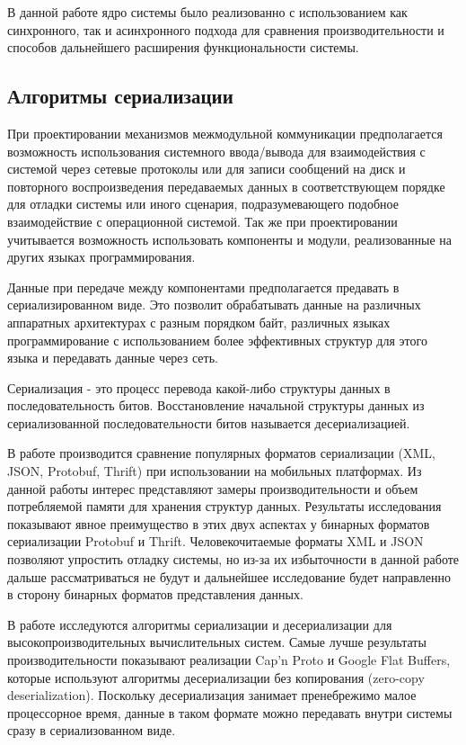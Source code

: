 В данной работе ядро системы было реализованно с использованием как синхронного, так и асинхронного подхода для сравнения производительности и способов дальнейшего расширения функциональности системы.

\subsection{Алгоритмы сериализации}

При проектировании механизмов межмодульной коммуникации предполагается возможность использования системного ввода/вывода для взаимодействия с системой через сетевые протоколы или для записи сообщений на диск и повторного воспроизведения передаваемых данных в соответствующем порядке для отладки системы или иного сценария, подразумевающего подобное взаимодействие с операционной системой. Так же при проектировании учитывается возможность использовать компоненты и модули, реализованные на других языках программирования.

Данные при передаче между компонентами предполагается предавать в сериализированном виде. Это позволит обрабатывать данные на различных аппаратных архитектурах с разным порядком байт, различных языках программирование с использованием более эффективных структур для этого языка и передавать данные через сеть.

Сериализация - это процесс перевода какой-либо структуры данных в последовательность битов. Восстановление начальной структуры данных из сериализованной последовательности битов называется десериализацией.

В работе \cite{sumaray2012comparison} производится сравнение популярных форматов сериализации (XML, JSON, Protobuf, Thrift) при использовании на мобильных платформах. Из данной работы интерес представляют замеры производительности и объем потребляемой памяти для хранения структур данных. Результаты исследования показывают явное преимущество в этих двух аспектах у бинарных форматов сериализации Protobuf и Thrift. Человекочитаемые форматы XML и JSON позволяют упростить отладку системы, но из-за их избыточности в данной работе дальше рассматриваться не будут и дальнейшее исследование будет направленно в сторону бинарных форматов представления данных.

В работе \cite{zaluzhnyi2016serialization} исследуются алгоритмы сериализации и десериализации для высокопроизводительных вычислительных систем. Самые лучше результаты производительности показывают реализации Cap'n Proto и Google Flat Buffers, которые используют алгоритмы десериализации без копирования (zero-copy deserialization). Поскольку десериализация занимает пренебрежимо малое процессорное время, данные в таком формате можно передавать внутри системы сразу в сериализованном виде.

